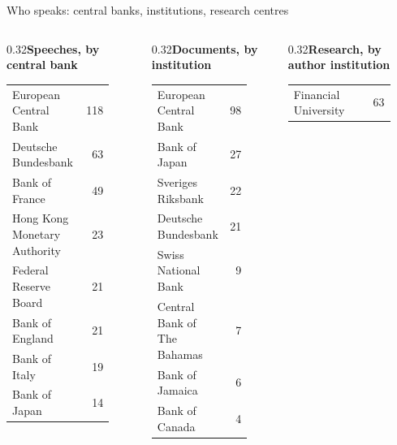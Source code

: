 \documentclass[aspectratio=169,10pt]{beamer}
\begin{document}
\begin{frame}{Who speaks: central banks, institutions, research centres}
\begin{columns}[T]\begin{column}{0.32\textwidth}\scriptsize\textbf{Speeches, by central bank}\\[2pt]\begin{tabular}{@{}p{0.8\linewidth}r@{}}European Central Bank & 118 \\
Deutsche Bundesbank & 63 \\
Bank of France & 49 \\
Hong Kong Monetary Authority & 23 \\
Federal Reserve Board & 21 \\
Bank of England & 21 \\
Bank of Italy & 19 \\
Bank of Japan & 14 \\\end{tabular}\end{column}\begin{column}{0.32\textwidth}\scriptsize\textbf{Documents, by institution}\\[2pt]\begin{tabular}{@{}p{0.8\linewidth}r@{}}European Central Bank & 98 \\
Bank of Japan & 27 \\
Sveriges Riksbank & 22 \\
Deutsche Bundesbank & 21 \\
Swiss National Bank & 9 \\
Central Bank of The Bahamas & 7 \\
Bank of Jamaica & 6 \\
Bank of Canada & 4 \\\end{tabular}\end{column}\begin{column}{0.32\textwidth}\scriptsize\textbf{Research, by author institution}\\[2pt]\begin{tabular}{@{}p{0.8\linewidth}r@{}}Financial University & 63 \\

\end{tabular}
\end{column}
\end{columns}
\end{frame}
\end{document}
